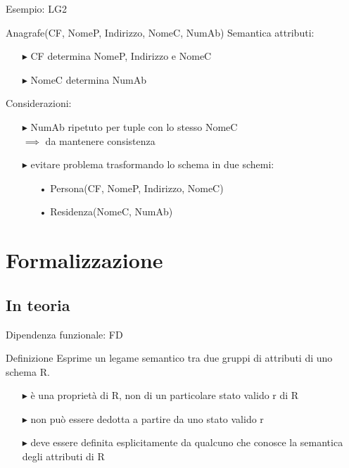 \documentclass{beamer}
\begin{document}
\begin{frame}{Esempio: LG2}

    \Large Anagrafe(CF, NomeP, Indirizzo, NomeC, NumAb)
    \vfill
    \normalsize Semantica attributi:
    \begin{itemize}
        \item[$\blacktriangleright$] CF determina NomeP, Indirizzo e NomeC
        \item[$\blacktriangleright$] NomeC determina NumAb
    \end{itemize}
    \vfill
    Considerazioni:
    \begin{itemize}
        \item[$\blacktriangleright$] NumAb ripetuto per tuple con lo stesso NomeC \\ $\implies$ da mantenere consistenza
        \item[$\blacktriangleright$] evitare problema trasformando lo schema in due schemi:
            \begin{itemize}
                \item[•] Persona(CF, NomeP, Indirizzo, NomeC)
                \item[•] Residenza(NomeC, NumAb)
            \end{itemize}
    \end{itemize}

\end{frame}

\section{Formalizzazione}

\subsection{In teoria}
\begin{frame}{Dipendenza funzionale: FD}

\begin{block}{Definizione}
Esprime un legame semantico tra due gruppi di attributi di uno schema R.
\end{block}
    \begin{itemize}
        \item[$\blacktriangleright$] è una proprietà di R, non di un particolare stato valido r di R
        \item[$\blacktriangleright$] non può essere dedotta a partire da uno stato valido r
        \item[$\blacktriangleright$] deve essere definita esplicitamente da qualcuno che conosce la semantica degli attributi di R
    \end{itemize}
\end{frame}
\end{document}
